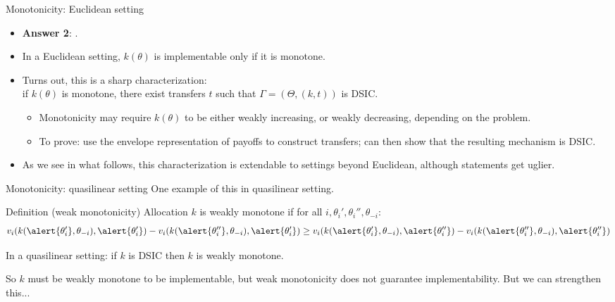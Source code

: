 \documentclass[english,10pt
,aspectratio=169
]{beamer}
\begin{document}
\begin{frame}{Monotonicity: Euclidean setting}
	\begin{itemize}
		\item \textbf{Answer 2}: .
		\item In a \alert{Euclidean} setting, $k(\theta)$ is implementable only if it is monotone.
		\item Turns out, this is a sharp characterization: \\
		if $k(\theta)$ is monotone, there exist transfers $t$ such that $\Gamma = (\Theta, (k,t))$ is DSIC.
		\begin{itemize}
			\item Monotonicity may require $k(\theta)$ to be either weakly increasing, or weakly decreasing, depending on the problem.
			\item To prove: use the envelope representation of payoffs to construct transfers; can then show that the resulting mechanism is DSIC.
		\end{itemize}
		\item As we see in what follows, this characterization is extendable to settings beyond Euclidean, although statements get uglier.
	\end{itemize}
\end{frame}


\begin{frame}{Monotonicity: quasilinear setting}
	One example of this in \alert{quasilinear} setting.
	\begin{exampleblock}{Definition (weak monotonicity)}
		Allocation $k$ is \alert{weakly monotone} if for all $i,\theta_i',\theta_i'',\theta_{-i}$:
		\begin{equation*}
			v_{i}(k(\alert{\theta_{i}'}, \theta_{-i}), \alert{\theta_{i}'}) - 
			v_{i}(k(\alert{\theta_{i}''}, \theta_{-i}), \alert{\theta_{i}'}) 
			\geq 
			v_{i}(k(\alert{\theta_{i}'}, \theta_{-i}), \alert{\theta_{i}''}) - 
			v_{i}(k(\alert{\theta_{i}''}, \theta_{-i}), \alert{\theta_{i}''}) 
		\end{equation*}
	\end{exampleblock}
	\begin{theorem}
		In a quasilinear setting: if $k$ is DSIC then $k$ is weakly monotone.
	\end{theorem}
	So $k$ must be weakly monotone to be implementable, but weak monotonicity does not guarantee implementability. But we can strengthen this...
\end{frame}
\end{document}
